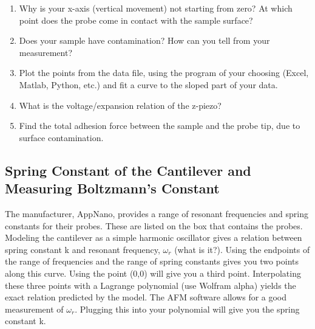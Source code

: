 \documentclass{../lab}
\begin{document}
{\begin{enumerate}
    \begin{itemize}
        \item Save your force-distance data when prompted

        \item right click to save an image of your data as well (but it can be later reproduced from your saved data in Excel, MatLab, Python, etc.)

    \end{itemize}

    \item Why is your x-axis (vertical movement) not starting from zero?  At which point does the probe come in contact with the sample surface?

    \item Does your sample have contamination? How can you tell from your measurement?

    \item Plot the points from the data file, using the program of your choosing (Excel, Matlab, Python, etc.) and fit a curve to the sloped part of your data.

    \item What is the voltage/expansion relation of the z-piezo?

    \item Find the total adhesion force between the sample and the probe tip, due to surface contamination.

\end{enumerate}

\subsection{Spring Constant of the Cantilever and Measuring Boltzmann's Constant}

The manufacturer, AppNano, provides a range of resonant frequencies and spring constants for their probes. These are listed on the box that contains the probes. Modeling the cantilever as a simple harmonic oscillator gives a relation between spring constant k and resonant frequency, $\omega_{r}$ (what is it?). Using the endpoints of the range of frequencies and the range of spring constants gives you two points along this curve. Using the point (0,0) will give you a third point. Interpolating these three points with a Lagrange polynomial (use Wolfram alpha) yields the exact relation predicted by the model. The AFM software allows for a good measurement of $\omega_{r}$. Plugging this into your polynomial will give you the spring constant k.

}
\end{document}
